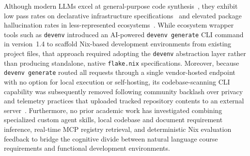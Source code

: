 Although modern LLMs excel at general-purpose code synthesis~\cite{chenEvaluatingLargeLanguage2021},
they exhibit low pass rates on declarative infrastructure specifications~\cite{konIaCEvalCodeGeneration,zhangDeployabilityCentricInfrastructureasCodeGeneration2025}
and elevated package hallucination rates in less-represented ecosystems~\cite{ImportingPhantomsMeasuring}.
While ecosystem wrapper tools such as \texttt{devenv} introduced an AI-powered
\texttt{devenv generate} CLI command in version~1.4 to scaffold Nix-based development
environments from existing project files, that approach required adopting the
\texttt{devenv} abstraction layer rather than producing standalone, native
\texttt{flake.nix} specifications. Moreover, because \texttt{devenv generate}
routed all requests through a single vendor-hosted endpoint with no option for
local execution or self-hosting, its codebase-scanning CLI capability was subsequently
removed following community backlash over privacy and telemetry practices that uploaded
tracked repository contents to an external server~\cite{goodingDevenvFacesBacklash2025}.
Furthermore, no prior academic work has investigated combining specialized custom
agent skills, local codebase and document requirement inference, real-time MCP registry
retrieval, and deterministic Nix evaluation feedback to bridge the cognitive
divide between natural language course requirements and functional development
environments.
